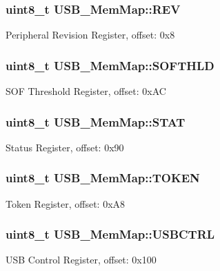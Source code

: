 \subsubsection[{R\+E\+V}]{\setlength{\rightskip}{0pt plus 5cm}uint8\+\_\+t U\+S\+B\+\_\+\+Mem\+Map\+::\+R\+E\+V}\label{struct_u_s_b___mem_map_ac918187248616aac7e5223124ea9610d}
Peripheral Revision Register, offset\+: 0x8 \hypertarget{struct_u_s_b___mem_map_a5462ecd3a3fe1425826815c78bfb8120}{}
\subsubsection[{S\+O\+F\+T\+H\+L\+D}]{\setlength{\rightskip}{0pt plus 5cm}uint8\+\_\+t U\+S\+B\+\_\+\+Mem\+Map\+::\+S\+O\+F\+T\+H\+L\+D}\label{struct_u_s_b___mem_map_a5462ecd3a3fe1425826815c78bfb8120}
S\+O\+F Threshold Register, offset\+: 0x\+A\+C \hypertarget{struct_u_s_b___mem_map_acad1a20eb41fab37316b6b7b98c00053}{}
\subsubsection[{S\+T\+A\+T}]{\setlength{\rightskip}{0pt plus 5cm}uint8\+\_\+t U\+S\+B\+\_\+\+Mem\+Map\+::\+S\+T\+A\+T}\label{struct_u_s_b___mem_map_acad1a20eb41fab37316b6b7b98c00053}
Status Register, offset\+: 0x90 \hypertarget{struct_u_s_b___mem_map_a8806f493a96bf80f94a1b04fd5a595a7}{}
\subsubsection[{T\+O\+K\+E\+N}]{\setlength{\rightskip}{0pt plus 5cm}uint8\+\_\+t U\+S\+B\+\_\+\+Mem\+Map\+::\+T\+O\+K\+E\+N}\label{struct_u_s_b___mem_map_a8806f493a96bf80f94a1b04fd5a595a7}
Token Register, offset\+: 0x\+A8 \hypertarget{struct_u_s_b___mem_map_a593a3dc10eb92a0dab6f62dbda5f0209}{}
\subsubsection[{U\+S\+B\+C\+T\+R\+L}]{\setlength{\rightskip}{0pt plus 5cm}uint8\+\_\+t U\+S\+B\+\_\+\+Mem\+Map\+::\+U\+S\+B\+C\+T\+R\+L}\label{struct_u_s_b___mem_map_a593a3dc10eb92a0dab6f62dbda5f0209}
U\+S\+B Control Register, offset\+: 0x100 \hypertarget{struct_u_s_b___mem_map_a1bb1b3975dfcbbe78635e2d08b16553d}{}
